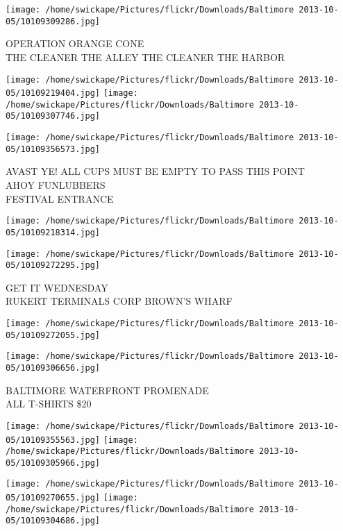 \documentclass[10pt,letterpaper]{article}
\begin{document}
\vspace{0.25in}
\texttt{[image: /home/swickape/Pictures/flickr/Downloads/Baltimore 2013-10-05/10109309286.jpg]}

OPERATION ORANGE CONE\\
THE CLEANER THE ALLEY THE CLEANER THE HARBOR
\pagebreak

\texttt{[image: /home/swickape/Pictures/flickr/Downloads/Baltimore 2013-10-05/10109219404.jpg]}
\texttt{[image: /home/swickape/Pictures/flickr/Downloads/Baltimore 2013-10-05/10109307746.jpg]}

\vspace{0.25in}
\texttt{[image: /home/swickape/Pictures/flickr/Downloads/Baltimore 2013-10-05/10109356573.jpg]}

AVAST YE! ALL CUPS MUST BE EMPTY TO PASS THIS POINT\\
AHOY FUNLUBBERS\\
FESTIVAL ENTRANCE
\pagebreak

\texttt{[image: /home/swickape/Pictures/flickr/Downloads/Baltimore 2013-10-05/10109218314.jpg]}

\vspace{0.25in}
\texttt{[image: /home/swickape/Pictures/flickr/Downloads/Baltimore 2013-10-05/10109272295.jpg]}

GET IT WEDNESDAY\\
RUKERT TERMINALS CORP BROWN'S WHARF
\pagebreak

\texttt{[image: /home/swickape/Pictures/flickr/Downloads/Baltimore 2013-10-05/10109272055.jpg]}

\vspace{0.25in}
\texttt{[image: /home/swickape/Pictures/flickr/Downloads/Baltimore 2013-10-05/10109306656.jpg]}

BALTIMORE WATERFRONT PROMENADE\\
ALL T{-}SHIRTS \$20
\pagebreak

\texttt{[image: /home/swickape/Pictures/flickr/Downloads/Baltimore 2013-10-05/10109355563.jpg]}
\texttt{[image: /home/swickape/Pictures/flickr/Downloads/Baltimore 2013-10-05/10109305966.jpg]}

\texttt{[image: /home/swickape/Pictures/flickr/Downloads/Baltimore 2013-10-05/10109270655.jpg]}
\texttt{[image: /home/swickape/Pictures/flickr/Downloads/Baltimore 2013-10-05/10109304686.jpg]}
\end{document}
